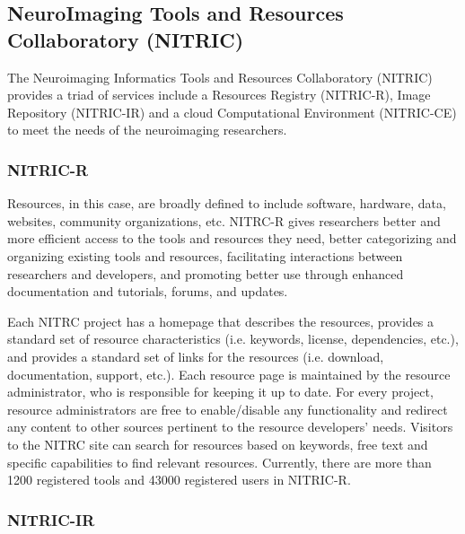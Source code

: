 \subsection{NeuroImaging Tools and Resources Collaboratory (NITRIC)} 
The Neuroimaging Informatics Tools and Resources Collaboratory
(NITRIC)~\cite{kennedy2016nitrc} provides a triad of services include a Resources Registry (NITRIC-R), Image Repository (NITRIC-IR) and a cloud Computational Environment (NITRIC-CE) to meet the needs of the neuroimaging researchers.



\subsubsection{NITRIC-R}

Resources, in this case, are broadly deﬁned to include software, hardware, data,
websites, community organizations, etc. NITRC-R gives researchers better and more efficient access to the tools and resources they need, better categorizing and organizing existing tools and resources, facilitating interactions between researchers and developers, and promoting better use through enhanced documentation and tutorials, forums, and updates. 

Each NITRC project has a homepage that describes the resources, provides
a standard set of resource characteristics (i.e. keywords, license,
dependencies, etc.), and provides a standard set of links for the resources
(i.e. download, documentation, support, etc.). Each resource page is
maintained by the resource administrator, who is responsible for
keeping it up to date. For every
project, resource administrators are free to enable/disable any
functionality and redirect any content to other sources pertinent to
the resource developers' needs. Visitors to the NITRC site can search
for resources based on keywords, free text and speciﬁc capabilities to ﬁnd relevant resources. Currently, there are more than 1200 registered tools and 43000 registered users in NITRIC-R. 

\subsubsection{NITRIC-IR}

